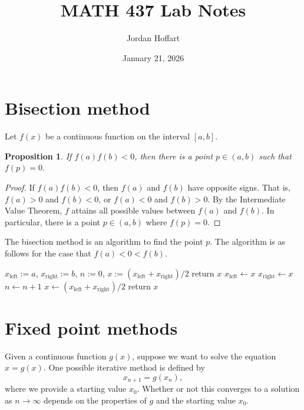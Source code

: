 \documentclass{article}
\title{MATH 437 Lab Notes}
\author{Jordan Hoffart}
\date{January 21, 2026}
\theoremstyle{plain}
\newtheorem{proposition}{Proposition}
\begin{document}
\maketitle

\section{Bisection method}

Let $f(x)$ be a continuous function on the interval $[a,b]$.

\begin{proposition}
  If $f(a)f(b) < 0$, then there is a point $p \in (a,b)$ such that $f(p) = 0$.
\end{proposition}
\begin{proof}
  If $f(a)f(b) < 0$, then $f(a)$ and $f(b)$ have opposite signs.
  That is, $f(a) > 0$ and $f(b) < 0$, or $f(a) < 0$ and $f(b) > 0$.
  By the Intermediate Value Theorem, $f$ attains all possible values between $f(a)$ and $f(b)$.
  In particular, there is a point $p \in (a,b)$ where $f(p) = 0$.
\end{proof}

The bisection method is an algorithm to find the point $p$.
The algorithm is as follows for the case that $f(a) < 0 < f(b)$.
\begin{algorithm}
  \caption{Bisection method}
  \begin{algorithmic}[1]
    \State $x_{\text{left}} := a$, $x_{\text{right}} := b$, $n := 0$, $x := (x_{\text{left}} + x_{\text{right}}) / 2$
    \State return $x$
    \State $x_{\text{left}} \gets x$
    \Else
    \State $x_{\text{right}} \gets x$
    \EndIf
    \State $n \gets n+1$
    \State $x \gets (x_{\text{left}} + x_{\text{right}}) / 2$
    \EndWhile
    \State return $x$
  \end{algorithmic}
\end{algorithm}

\section{Fixed point methods}

Given a continuous function $g(x)$, suppose we want to solve the equation $x = g(x)$.
One possible iterative method is defined by
\begin{equation}\label{eq:iterative_method}
  x_{n+1} = g(x_n),
\end{equation}
where we provide a starting value $x_0$.
Whether or not this converges to a solution as $n \to \infty$ depends on the properties of $g$ and the starting value $x_0$.
\end{document}
